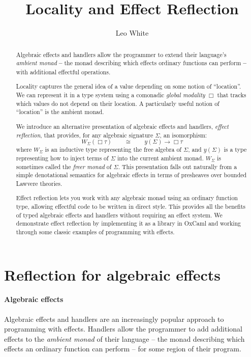 \documentclass[acmsmall, screen, nonacm]{acmart}
\title{Locality and Effect Reflection}
\author{Leo White}
\affiliation{\institution{Jane Street}\country{UK}}
\date{}
\theoremstyle{definition}
\newcommand{\glob}{\mathop{\Box}}
\newcommand{\yoneda}[1]{y(#1)}
\newcommand{\ind}[1]{W_{#1}}
\begin{document}
\begin{abstract}
  Algebraic effects and handlers allow the programmer to extend their
  language's \emph{ambient monad} \textbf{--} the monad describing which
  effects ordinary functions can perform \textbf{--} with additional
  effectful operations.

  Locality captures the general idea of a value depending on some notion
  of ``location''. We can represent it in a type system using a
  comonadic \emph{global modality} $\glob$ that tracks which values do
  not depend on their location. A particularly useful notion of
  ``location'' is the ambient monad.

  We introduce an alternative presentation of algebraic effects and
  handlers, \emph{effect reflection}, that provides, for any algebraic
  signature $\Sigma$, an isomorphism:
  \begin{equation*}
    \ind{\Sigma}(\glob \tau) \qquad \cong \qquad \yoneda{\Sigma} \rightarrow \glob \tau
  \end{equation*}
  where $\ind{\Sigma}$ is an inductive type representing the free
  algebra of $\Sigma$, and $\yoneda{\Sigma}$ is a type representing how
  to inject terms of $\Sigma$ into the current ambient
  monad. $\ind{\Sigma}$ is sometimes called the \emph{freer monad} of
  $\Sigma$. This presentation falls out naturally from a simple
  denotational semantics for algebraic effects in terms of presheaves
  over bounded Lawvere theories.

  Effect reflection lets you work with any algebraic monad using an
  ordinary function type, allowing effectful code to be written in
  direct style. This provides all the benefits of typed algebraic
  effects and handlers without requiring an effect system. We
  demonstrate effect reflection by implementing it as a library in
  OxCaml\cite{lorenzen2024oxidizing,} and working through some classic
  examples of programming with effects.
\end{abstract}

\maketitle

\section{Reflection for algebraic effects}

\paragraph{Algebraic effects} Algebraic effects and handlers are an
increasingly popular approach to programming with effects. Handlers
allow the programmer to add additional effects to the \emph{ambient
  monad} of their language -- the monad describing which effects an
ordinary function can perform -- for some region of their program.
\end{document}
